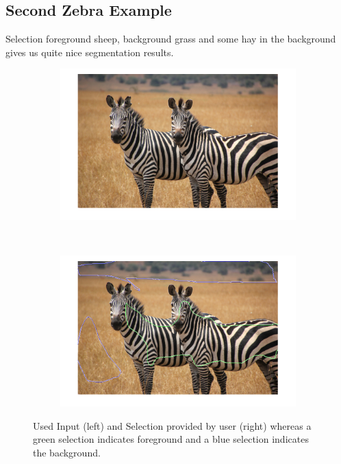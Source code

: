 \documentclass{paper}
\begin{document}
\subsection{Second Zebra Example}

Selection foreground sheep, background grass and some hay in the background gives us quite nice segmentation results.

\begin{figure}[H]
    \centering
    \begin{subfigure}{0.45\textwidth}
        \includegraphics[width=\textwidth]{../../outputs/p4/image_segmentation/zebra2/input}
    \end{subfigure}
    ~
        \begin{subfigure}{0.45\textwidth}
        \includegraphics[width=\textwidth]{../../outputs/p4/image_segmentation/zebra2/selection}
    \end{subfigure}
    
    \caption{Used Input (left) and Selection provided by user (right) whereas a green selection indicates foreground and a blue selection indicates the background.}
    \label{fig:segmentation_zebra2_input_selection}       
\end{figure}
\end{document}
